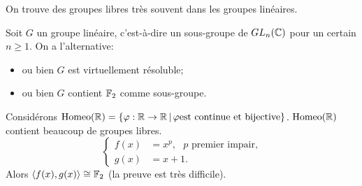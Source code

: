   \begin{rem}
    On trouve des groupes libres très souvent dans les groupes linéaires.
  \end{rem}

  \begin{theo}
    Soit $G$ un groupe linéaire, c'est-à-dire un sous-groupe de $GL_n(\mathbb{C})$ pour un certain $n \geq 1$. On a
    l'alternative:
    \begin{itemize}
    \item ou bien $G$ est virtuellement résoluble;
    \item ou bien $G$ contient $\mathbb{F}_2$ comme sous-groupe.
    \end{itemize}
  \end{theo}

  \begin{ex}
    Considérons $\mathrm{Homeo}(\mathbb{R}) = \{\varphi: \mathbb{R} \to \mathbb{R}\, |\, \varphi \text{est continue et
      bijective}\}$. $\mathrm{Homeo}(\mathbb{R})$ contient beaucoup de groupes libres. 
    \begin{equation*}
      \begin{cases}
        f(x) &= x^p, \text{ $p$ premier impair,}\\
        g(x) &= x+1.
      \end{cases}
    \end{equation*}
    Alors $\langle f(x), g(x)\rangle \cong \mathbb{F}_2 $ (la preuve est très difficile).
  \end{ex}
  
  

  




